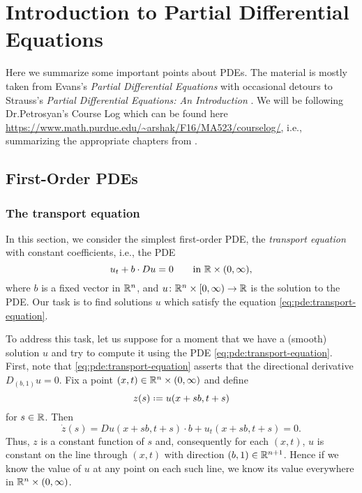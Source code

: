 \chapter{Introduction to Partial Differential Equations}
Here we summarize some important points about PDEs. The material is mostly
taken from Evans's \emph{Partial Differential Equations} \cite{evans} with
occasional detours to Strauss's \emph{Partial Differential Equations: An
  Introduction} \cite{strauss}. We will be following Dr.\@ Petrosyan's
\textsf{Course Log} which can be found here
\url{https://www.math.purdue.edu/~arshak/F16/MA523/courselog/}, i.e.,
summarizing the appropriate chapters from \cite{evans}.

\section{First-Order PDEs}
\subsection{The transport equation}
In this section, we consider the simplest first-order PDE, the
\emph{transport equation} with constant coefficients, i.e., the PDE
\begin{equation}
  \label{eq:pde:transport-equation}
  u_t+b\cdot Du=0\qquad\text{in \(\mathbb{R}\times(0,\infty)\),}
\end{equation}
where \(b\) is a fixed vector in \(\mathbb{R}^n\), and
\(u\colon\mathbb{R}^n\times[0,\infty)\to\mathbb{R}\) is the solution to the PDE. Our
task is to find solutions \(u\) which satisfy the equation
\eqref{eq:pde:transport-equation}.

To address this task, let us suppose for a moment that we have a (smooth)
solution \(u\) and try to compute it using the PDE
\eqref{eq:pde:transport-equation}. First, note that
\eqref{eq:pde:transport-equation} asserts that the directional derivative
\(D_{(b,1)}u=0\). Fix a point \((x,t)\in\mathbb{R}^n\times(0,\infty)\) and define
\[
  z(s)\defeq u(x+sb,t+s)
\]
for \(s\in\mathbb{R}\). Then
\[
  \dot z(s)=Du(x+sb,t+s)\cdot b+u_t(x+sb,t+s)=0.
\]
Thus, \(z\) is a constant function of \(s\) and, consequently for each
\((x,t)\), \(u\) is constant on the line through \((x,t)\) with direction
\((b,1)\in\mathbb{R}^{n+1}\). Hence if we know the value of \(u\) at any point on
each such line, we know its value everywhere in \(\mathbb{R}^n\times(0,\infty)\).

